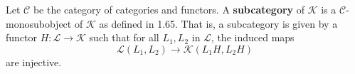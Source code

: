 Let $\mathcal{C}$ be the category of categories and functors. A \textbf{subcategory} of $\mathcal{K}$ is a $\mathcal{C}$-monosubobject of $\mathcal{K}$ as defined in 1.65. That is, a subcategory is given by a functor $H: \mathcal{L} \longrightarrow \mathcal{K}$ such that for all $L_1, L_2$ in $\mathcal{L}$, the induced maps
$$
\mathcal{L}(L_1, L_2) \longrightarrow \mathcal{K}(L_1 H, L_2 H)
$$
are injective.
